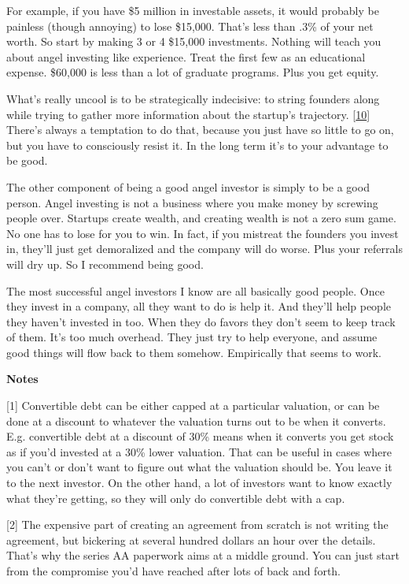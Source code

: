 For example, if you have \$5 million in investable assets, it would
probably be painless (though annoying) to lose \$15,000. That's less
than .3\% of your net worth. So start by making 3 or 4 \$15,000
investments. Nothing will teach you about angel investing like
experience. Treat the first few as an educational expense. \$60,000 is
less than a lot of graduate programs. Plus you get equity.

What's really uncool is to be strategically indecisive: to string
founders along while trying to gather more information about the
startup's trajectory. {[}\hyperref[f10n]{10}{]} There's always a
temptation to do that, because you just have so little to go on, but you
have to consciously resist it. In the long term it's to your advantage
to be good.

The other component of being a good angel investor is simply to be a
good person. Angel investing is not a business where you make money by
screwing people over. Startups create wealth, and creating wealth is not
a zero sum game. No one has to lose for you to win. In fact, if you
mistreat the founders you invest in, they'll just get demoralized and
the company will do worse. Plus your referrals will dry up. So I
recommend being good.

The most successful angel investors I know are all basically good
people. Once they invest in a company, all they want to do is help it.
And they'll help people they haven't invested in too. When they do
favors they don't seem to keep track of them. It's too much overhead.
They just try to help everyone, and assume good things will flow back to
them somehow. Empirically that seems to work.

\textbf{Notes}

{[}1{]} Convertible debt can be either capped at a particular valuation,
or can be done at a discount to whatever the valuation turns out to be
when it converts. E.g. convertible debt at a discount of 30\% means when
it converts you get stock as if you'd invested at a 30\% lower
valuation. That can be useful in cases where you can't or don't want to
figure out what the valuation should be. You leave it to the next
investor. On the other hand, a lot of investors want to know exactly
what they're getting, so they will only do convertible debt with a cap.

{[}2{]} The expensive part of creating an agreement from scratch is not
writing the agreement, but bickering at several hundred dollars an hour
over the details. That's why the series AA paperwork aims at a middle
ground. You can just start from the compromise you'd have reached after
lots of back and forth.

